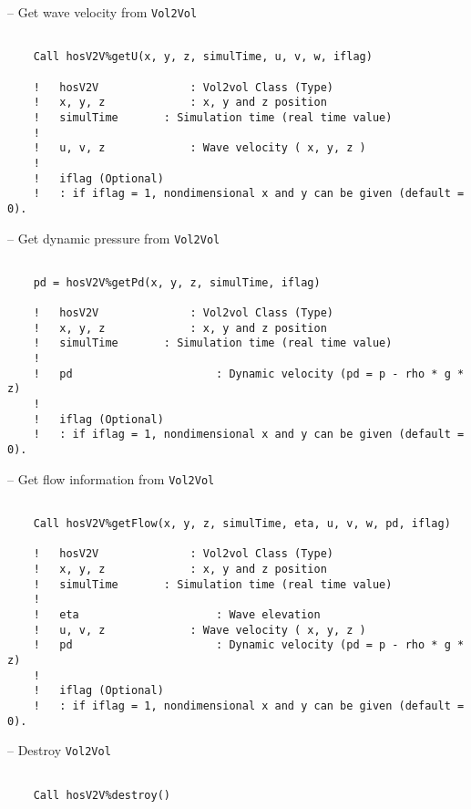 	\pagebreak	
	
	\hspace{0.5 cm} -- Get wave velocity from \texttt{Vol2Vol}
	
	\begin{lstlisting}[language={[95]Fortran}]
	
	Call hosV2V%getU(x, y, z, simulTime, u, v, w, iflag)
	
	!	hosV2V				: Vol2vol Class (Type)
	!	x, y, z				: x, y and z position 
	!	simulTime 		: Simulation time (real time value)
	!
	!	u, v, z				: Wave velocity ( x, y, z )
	!
	!	iflag (Optional)	
	!	: if iflag = 1, nondimensional x and y can be given (default = 0). 	
	\end{lstlisting}	
	
	\hspace{0.5 cm} -- Get dynamic pressure from \texttt{Vol2Vol}
	
	\begin{lstlisting}[language={[95]Fortran}]
	
	pd = hosV2V%getPd(x, y, z, simulTime, iflag)
	
	!	hosV2V				: Vol2vol Class (Type)
	!	x, y, z				: x, y and z position 
	!	simulTime 		: Simulation time (real time value)
	!
	!	pd						: Dynamic velocity (pd = p - rho * g * z)
	!
	!	iflag (Optional)	
	!	: if iflag = 1, nondimensional x and y can be given (default = 0). 	
	\end{lstlisting}	

	\hspace{0.5 cm} -- Get flow information from \texttt{Vol2Vol}
	
	\begin{lstlisting}[language={[95]Fortran}]
	
	Call hosV2V%getFlow(x, y, z, simulTime, eta, u, v, w, pd, iflag)
	
	!	hosV2V				: Vol2vol Class (Type)
	!	x, y, z				: x, y and z position 
	!	simulTime 		: Simulation time (real time value)
	!
	!	eta						: Wave elevation
	!	u, v, z				: Wave velocity ( x, y, z )
	!	pd						: Dynamic velocity (pd = p - rho * g * z)
	!
	!	iflag (Optional)	
	!	: if iflag = 1, nondimensional x and y can be given (default = 0). 	
	\end{lstlisting}	
	
	\hspace{0.5 cm} -- Destroy \texttt{Vol2Vol}
	
	\begin{lstlisting}[language={[95]Fortran}]

	Call hosV2V%destroy()	
	\end{lstlisting}	
